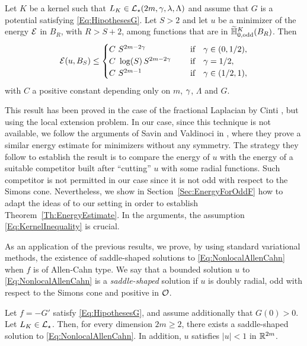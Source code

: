 \begin{theorem}
	\label{Th:EnergyEstimate} 
	Let $K$ be a kernel such that $L_K\in \mathcal{L}_\star(2m, \gamma, \lambda, \Lambda)$ and assume that $G$ is a potential satisfying \eqref{Eq:HipothesesG}. Let $S>2$ and let $u$ be a minimizer of the energy $\mathcal{E}$ in $B_{R}$, with $R>S+2$, among functions that are in $\widetilde{\mathbb{H}}^K_{0, \mathrm{odd}}(B_R)$. Then
	$$ \mathcal{E} (u,B_S) \leq \begin{cases}
	C \ S^{2m-2\gamma}\ \ \ \ &\textrm{if } \ \ \gamma\in(0,1/2),\\
	C\ \log(S)\,S^{2m-2\gamma}\ \ \ \ &\textrm{if } \ \ \gamma=1/2,\\
	C \ S^{2m-1}\ \ \ \ &\textrm{if } \ \ \gamma\in(1/2,1),\\
	\end{cases} $$
	with $C$ a positive constant depending only on $m$, $\gamma$, $\Lambda$ and $G$.
\end{theorem}



This result has been proved in the case of the fractional Laplacian by Cinti \cite{Cinti-Saddle,Cinti-Saddle2}, but using the local extension problem. In our case, since this technique is not available, we follow the arguments of Savin and Valdinoci in \cite{SavinValdinoci-EnergyEstimate}, where they prove a similar energy estimate for minimizers without any symmetry. The strategy they follow to establish the result is to compare the energy of $u$ with the energy of a suitable competitor built after ``cutting''  $u$ with some radial functions. Such competitor is not permitted in our case since it is not odd with respect to the Simons cone. Nevertheless, we show in Section~\ref{Sec:EnergyForOddF} how to adapt the ideas of \cite{SavinValdinoci-EnergyEstimate} to our setting in order to establish Theorem~\ref{Th:EnergyEstimate}. In the arguments, the assumption \eqref{Eq:KernelInequality} is crucial.


As an application of the previous results, we prove, by using standard variational methods, the existence of saddle-shaped solutions to  \eqref{Eq:NonlocalAllenCahn} when $f$ is of Allen-Cahn type. We say that a bounded solution $u$ to \eqref{Eq:NonlocalAllenCahn} is a \emph{saddle-shaped} solution if $u$ is doubly radial, odd with respect to the Simons cone and positive in $\mathcal{O}$. 

\begin{theorem}
	\label{Th:Existence}
    Let $f=-G'$ satisfy \eqref{Eq:HipothesesG}, and assume additionally that $G(0)>0$. Let $L_K\in \mathcal{L}_\star$. Then, for every dimension $2m \geq 2$, there exists a saddle-shaped solution to \eqref{Eq:NonlocalAllenCahn}. In addition, $u$ satisfies $|u|<1$ in $\mathbb{R}^{2m}$.
\end{theorem}

